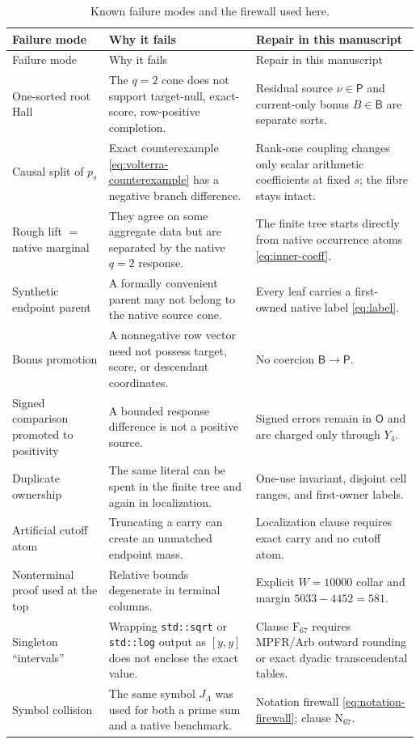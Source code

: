 \documentclass[11pt]{article}
\theoremstyle{definition}
\theoremstyle{remark}
\newcommand{\1}{\mathbf 1}
\newcommand{\Src}{\mathsf P}
\newcommand{\Bonus}{\mathsf B}
\newcommand{\Obs}{\mathsf O}
\begin{document}
\begin{longtable}{@{}p{}p{}p{}@{}}
\caption{Known failure modes and the firewall used here.}\label{tab:failures}\\
\toprule
Failure mode & Why it fails & Repair in this manuscript\\
\midrule
\endfirsthead
\toprule
Failure mode & Why it fails & Repair in this manuscript\\
\midrule
\endhead
One-sorted root Hall & The \(q=2\) cone does not support target-null, exact-score, row-positive completion. & Residual source \(\nu\in\Src\) and current-only bonus \(B\in\Bonus\) are separate sorts.\\
\addlinespace
Causal split of \(p_s\) & Exact counterexample \eqref{eq:volterra-counterexample} has a negative branch difference. & Rank-one coupling changes only scalar arithmetic coefficients at fixed \(s\); the fibre stays intact.\\
\addlinespace
Rough lift \(=\) native marginal & They agree on some aggregate data but are separated by the native \(q=2\) response. & The finite tree starts directly from native occurrence atoms \eqref{eq:inner-coeff}.\\
\addlinespace
Synthetic endpoint parent & A formally convenient parent may not belong to the native source cone. & Every leaf carries a first-owned native label \eqref{eq:label}.\\
\addlinespace
Bonus promotion & A nonnegative row vector need not possess target, score, or descendant coordinates. & No coercion \(\Bonus\to\Src\).\\
\addlinespace
Signed comparison promoted to positivity & A bounded response difference is not a positive source. & Signed errors remain in \(\Obs\) and are charged only through \(Y_4\).\\
\addlinespace
Duplicate ownership & The same literal can be spent in the finite tree and again in localization. & One-use invariant, disjoint cell ranges, and first-owner labels.\\
\addlinespace
Artificial cutoff atom & Truncating a carry can create an unmatched endpoint mass. & Localization clause requires exact carry and no cutoff atom.\\
\addlinespace
Nonterminal proof used at the top & Relative bounds degenerate in terminal columns. & Explicit \(W=10000\) collar and margin \(5033-4452=581\).\\
\addlinespace
Singleton ``intervals'' & Wrapping \texttt{std::sqrt} or \texttt{std::log} output as \([y,y]\) does not enclose the exact value. & Clause \(\mathrm F_{67}\) requires MPFR/Arb outward rounding or exact dyadic transcendental tables.\\
\addlinespace
Symbol collision & The same symbol \(J_\Lambda\) was used for both a prime sum and a native benchmark. & Notation firewall \eqref{eq:notation-firewall}; clause \(\mathrm N_{67}\).\\
\bottomrule
\end{longtable}
\end{document}
